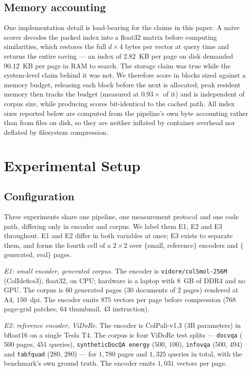 \documentclass[conference]{IEEEtran}
\begin{document}
\subsection{Memory accounting}
\label{sec:memory}
One implementation detail is load-bearing for the claims in this paper. A naive
scorer decodes the packed index into a float32 matrix before computing
similarities, which restores the full $d \times 4$ bytes per vector at query time
and returns the entire saving --- an index of $2.82$~KB per page on disk demanded
$90.12$~KB per page in RAM to search. The storage claim was true while the
system-level claim behind it was not. We therefore score in blocks sized against
a memory budget, releasing each block before the next is allocated; peak resident
memory then tracks the budget (measured at $0.93\times$ of it) and is independent
of corpus size, while producing scores bit-identical to the cached path.
All index sizes reported below are computed from the pipeline's own byte
accounting rather than from files on disk, so they are neither inflated by
container overhead nor deflated by filesystem compression.

\section{Experimental Setup}

\subsection{Configuration}
Three experiments share one pipeline, one measurement protocol and one code
path, differing only in encoder and corpus. We label them E1, E2 and E3
throughout. E1 and E2 differ in both variables at once; E3 exists to separate
them, and forms the fourth cell of a $2 \times 2$ over $\{$small,
reference$\}$ encoders and $\{$generated, real$\}$ pages.

\emph{E1: small encoder, generated corpus.} The encoder is
\texttt{vidore/colSmol-256M} (ColIdefics3), float32, on CPU; hardware is a laptop
with $8$~GB of DDR4 and no GPU. The corpus is $60$ generated pages ($30$ documents
of $2$ pages) rendered at A4, $150$~dpi. The encoder emits $875$ vectors per page
before compression ($768$ page-grid patches, $64$ thumbnail, $43$ instruction).

\emph{E2: reference encoder, ViDoRe.} The encoder is ColPali-v1.3 ($3$B
parameters) in bfloat16 on a single Tesla T4. The corpus is four ViDoRe test
splits --- \texttt{docvqa} ($500$ pages, $451$ queries), \texttt{syntheticDocQA
energy} ($500$, $100$), \texttt{infovqa} ($500$, $494$) and \texttt{tabfquad}
($280$, $280$) --- for $1{,}780$ pages and $1{,}325$ queries in total, with the
benchmark's own ground truth. The encoder emits $1{,}031$ vectors per page.
\end{document}
